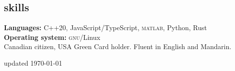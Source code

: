 \documentclass[margin,10pt]{res}
\begin{document}
\begin{resume}
\section{\sc \lsstyle skills}
    \textbf{Languages:}
    C++20, JavaScript/TypeScript, \textsc{matlab}, Python, Rust \\
    \textbf{Operating system:} \textsc{gnu}/Linux\\
    Canadian citizen, USA Green Card holder. Fluent in English and Mandarin.\\
\end{resume}
\begin{minipage}[t]{\textwidth}
    \flushright
    \small
    \sc \lsstyle
    \hfill updated \today
\end{minipage}
\end{document}
